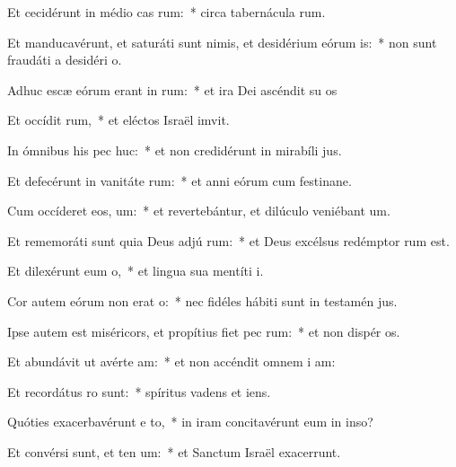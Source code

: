\item Et cecidérunt in médio cas rum:~* circa tabernácula rum.
\item Et manducavérunt, et saturáti sunt nimis, et desidérium eórum  is:~* non sunt fraudáti a desidéri o.
\item Adhuc escæ eórum erant in  rum:~* et ira Dei ascéndit su os
\item Et occídit  rum,~* et eléctos Israël imvit.
\item In ómnibus his pec huc:~* et non credidérunt in mirabíli jus.
\item Et defecérunt in vanitáte  rum:~* et anni eórum cum festinane.
\item Cum occíderet eos,  um:~* et revertebántur, et dilúculo veniébant  um.
\item Et rememoráti sunt quia Deus adjú  rum:~* et Deus excélsus redémptor rum est.
\item Et dilexérunt eum   o,~* et lingua sua mentíti  i.
\item Cor autem eórum non erat   o:~* nec fidéles hábiti sunt in testamén jus.
\item Ipse autem est miséricors, et propítius fiet pec rum:~* et non dispér os.
\item Et abundávit ut avérte  am:~* et non accéndit omnem i am:
\item Et recordátus   ro sunt:~* spíritus vadens et  iens.
\item Quóties exacerbavérunt e  to,~* in iram concitavérunt eum in inso?
\item Et convérsi sunt, et ten um:~* et Sanctum Israël exacerrunt.

